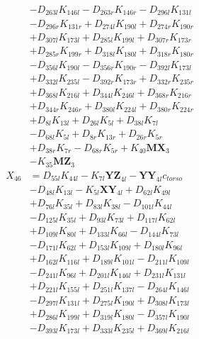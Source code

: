 \begin{multicols}{2}
\begin{align}
&- D_{263l}K_{146l} - D_{263r}K_{146r} - D_{296l}K_{131l}  \nonumber \\
&- D_{296r}K_{131r} + D_{274l}K_{190l} + D_{274r}K_{190r}  \nonumber \\
&+ D_{307l}K_{173l} + D_{285l}K_{199l} + D_{307r}K_{173r}  \nonumber \\
&+ D_{285r}K_{199r} + D_{318l}K_{180l} + D_{318r}K_{180r}  \nonumber \\
&- D_{356l}K_{190l} - D_{356r}K_{190r} - D_{392l}K_{173l}  \nonumber \\
&+ D_{332l}K_{235l} - D_{392r}K_{173r} + D_{332r}K_{235r}  \nonumber \\
&+ D_{368l}K_{216l} + D_{344l}K_{246l} + D_{368r}K_{216r}  \nonumber \\
&+ D_{344r}K_{246r} + D_{380l}K_{224l} + D_{380r}K_{224r}  \nonumber \\
&+ D_{8l}K_{13l} + D_{26l}K_{5l} + D_{38l}K_{7l}  \nonumber \\
&- D_{68l}K_{5l} + D_{8r}K_{13r} + D_{26r}K_{5r}  \nonumber \\
&+ D_{38r}K_{7r} - D_{68r}K_{5r} + K_{40}\mathbf{MX}_3  \nonumber \\
&- K_{35}\mathbf{MZ}_3 \nonumber \\
X_{46} &= D_{55l}K_{44l} - K_{7l}\mathbf{YZ}_{4l} - \mathbf{YY}_{4l}c_{torso}  \nonumber \\
&- D_{48l}K_{13l} - K_{5l}\mathbf{XY}_{4l} + D_{62l}K_{49l}  \nonumber \\
&+ D_{76l}K_{35l} + D_{83l}K_{38l} - D_{101l}K_{44l}  \nonumber \\
&- D_{125l}K_{35l} + D_{93l}K_{73l} + D_{117l}K_{62l}  \nonumber \\
&+ D_{109l}K_{80l} + D_{133l}K_{66l} - D_{144l}K_{73l}  \nonumber \\
&- D_{171l}K_{62l} + D_{153l}K_{109l} + D_{180l}K_{96l}  \nonumber \\
&+ D_{162l}K_{116l} + D_{189l}K_{101l} - D_{211l}K_{109l}  \nonumber \\
&- D_{241l}K_{96l} + D_{201l}K_{146l} + D_{231l}K_{131l}  \nonumber \\
&+ D_{221l}K_{155l} + D_{251l}K_{137l} - D_{264l}K_{146l}  \nonumber \\
&- D_{297l}K_{131l} + D_{275l}K_{190l} + D_{308l}K_{173l}  \nonumber \\
&+ D_{286l}K_{199l} + D_{319l}K_{180l} - D_{357l}K_{190l}  \nonumber \\
&- D_{393l}K_{173l} + D_{333l}K_{235l} + D_{369l}K_{216l}  \nonumber \\

\end{align}
\end{multicols}
